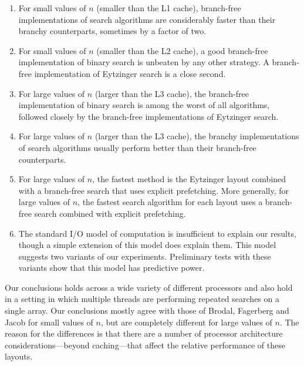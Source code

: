 \documentclass{patmorin}
\begin{document}
\begin{enumerate}
  \item For small values of $n$ (smaller than the L1 cache), branch-free
    implementations of search algorithms are considerably faster than their
    branchy counterparts, sometimes by a factor of two.
  
  \item For small values of $n$ (smaller than the L2 cache), a good
    branch-free implementation of binary search is unbeaten by any other
    strategy.  A branch-free implementation of Eytzinger search is a
    close second.
  
  \item For large values of $n$ (larger than the L3 cache), the branch-free
    implementation of binary search is among the worst of all algorithms,
    followed closely by the branch-free implementations of Eytzinger
    search.
  
  \item For large values of $n$ (larger than the L3 cache), the branchy
    implementations of search algorithms usually perform better than their
    branch-free counterparts.

  \item For large values of $n$, the fastest method is the Eytzinger
   layout combined with a branch-free search that uses explicit
   prefetching.  More generally, for large values of $n$, the fastest
   search algorithm for each layout uses a branch-free search combined
   with explicit prefetching.

  \item The standard I/O model of computation \cite{aggarwal.vitter:input}
   is insufficient to explain our results, though a simple extension
   of this model does explain them.  This model suggests two variants
   of our experiments.  Preliminary tests with these variants show that
   this model has predictive power.
\end{enumerate}

Our conclusions holds across a wide variety of different processors and
also hold in a setting in which multiple threads are performing repeated
searches on a single array.  Our conclusions mostly agree with those of
Brodal, Fagerberg and Jacob for small values of $n$, but are completely
different for large values of $n$.  The reason for the differences is
that there are a number of processor architecture considerations---beyond
caching---that affect the relative performance of these layouts.
\end{document}
